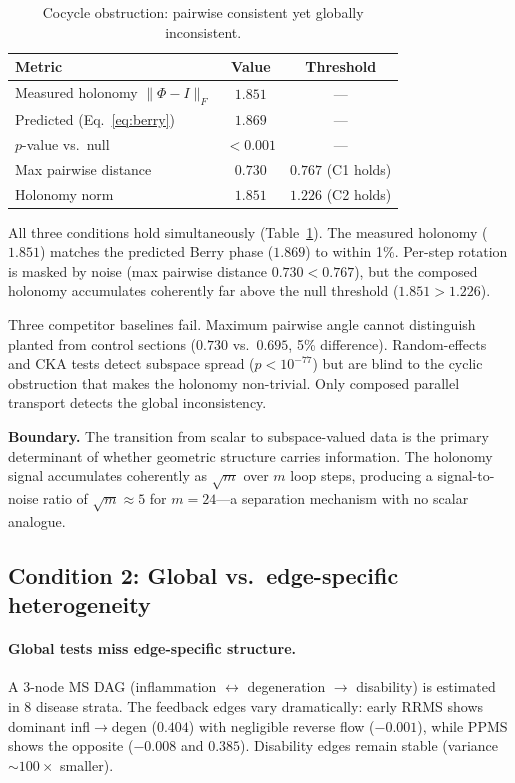 \documentclass{article}
\begin{document}
\begin{table}[t]
\centering
\caption{Cocycle obstruction: pairwise consistent yet globally inconsistent.}
\label{tab:cocycle}
\small
\begin{tabular}{@{}lcc@{}}
\toprule
\textbf{Metric} & \textbf{Value} & \textbf{Threshold} \\
\midrule
Measured holonomy $\|\Phi - I\|_F$ & $1.851$ & --- \\
Predicted (Eq.~\ref{eq:berry}) & $1.869$ & --- \\
$p$-value vs.\ null & $< 0.001$ & --- \\
\midrule
Max pairwise distance & $0.730$ & $0.767$ (C1 holds) \\
Holonomy norm & $1.851$ & $1.226$ (C2 holds) \\
\bottomrule
\end{tabular}
\end{table}

All three conditions hold simultaneously (Table~\ref{tab:cocycle}).
The measured holonomy ($1.851$) matches the predicted Berry phase ($1.869$) to within 1\%.
Per-step rotation is masked by noise (max pairwise distance $0.730 < 0.767$), but the composed holonomy accumulates coherently far above the null threshold ($1.851 > 1.226$).

Three competitor baselines fail.
Maximum pairwise angle cannot distinguish planted from control sections ($0.730$ vs.\ $0.695$, 5\% difference).
Random-effects and CKA tests detect subspace spread ($p < 10^{-77}$) but are blind to the cyclic obstruction that makes the holonomy non-trivial.
Only composed parallel transport detects the global inconsistency.

\textbf{Boundary.} The transition from scalar to subspace-valued data is the primary determinant of whether geometric structure carries information.
The holonomy signal accumulates coherently as $\sqrt{m}$ over $m$ loop steps, producing a signal-to-noise ratio of $\sqrt{m} \approx 5$ for $m = 24$---a separation mechanism with no scalar analogue.

\subsection{Condition 2: Global vs.\ edge-specific heterogeneity}
\label{sec:res-global-vs-edge}

\paragraph{Global tests miss edge-specific structure.}
A 3-node MS DAG (inflammation $\leftrightarrow$ degeneration $\to$ disability) is estimated in 8 disease strata.
The feedback edges vary dramatically: early RRMS shows dominant infl$\to$degen ($0.404$) with negligible reverse flow ($-0.001$), while PPMS shows the opposite ($-0.008$ and $0.385$).
Disability edges remain stable (variance $\sim\!100\times$ smaller).
\end{document}

